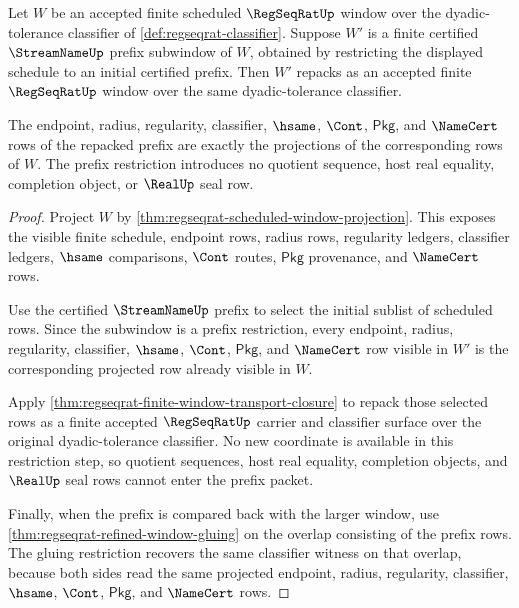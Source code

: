 \begin{theorem}
\label{thm:regseqrat-prefix-window-monotonicity}
Let $W$ be an accepted finite scheduled $\RegSeqRatUp$ window over the dyadic-tolerance classifier of \autoref{def:regseqrat-classifier}. Suppose $W'$ is a finite certified $\StreamNameUp$ prefix subwindow of $W$, obtained by restricting the displayed schedule to an initial certified prefix. Then $W'$ repacks as an accepted finite $\RegSeqRatUp$ window over the same dyadic-tolerance classifier.

The endpoint, radius, regularity, classifier, $\hsame$, $\Cont$, $\mathsf{Pkg}$, and $\NameCert$ rows of the repacked prefix are exactly the projections of the corresponding rows of $W$. The prefix restriction introduces no quotient sequence, host real equality, completion object, or $\RealUp$ seal row.
\end{theorem}
\begin{proof}
Project $W$ by \autoref{thm:regseqrat-scheduled-window-projection}. This exposes the visible finite schedule, endpoint rows, radius rows, regularity ledgers, classifier ledgers, $\hsame$ comparisons, $\Cont$ routes, $\mathsf{Pkg}$ provenance, and $\NameCert$ rows.

Use the certified $\StreamNameUp$ prefix to select the initial sublist of scheduled rows. Since the subwindow is a prefix restriction, every endpoint, radius, regularity, classifier, $\hsame$, $\Cont$, $\mathsf{Pkg}$, and $\NameCert$ row visible in $W'$ is the corresponding projected row already visible in $W$.

Apply \autoref{thm:regseqrat-finite-window-transport-closure} to repack those selected rows as a finite accepted $\RegSeqRatUp$ carrier and classifier surface over the original dyadic-tolerance classifier. No new coordinate is available in this restriction step, so quotient sequences, host real equality, completion objects, and $\RealUp$ seal rows cannot enter the prefix packet.

Finally, when the prefix is compared back with the larger window, use \autoref{thm:regseqrat-refined-window-gluing} on the overlap consisting of the prefix rows. The gluing restriction recovers the same classifier witness on that overlap, because both sides read the same projected endpoint, radius, regularity, classifier, $\hsame$, $\Cont$, $\mathsf{Pkg}$, and $\NameCert$ rows.
\end{proof}

